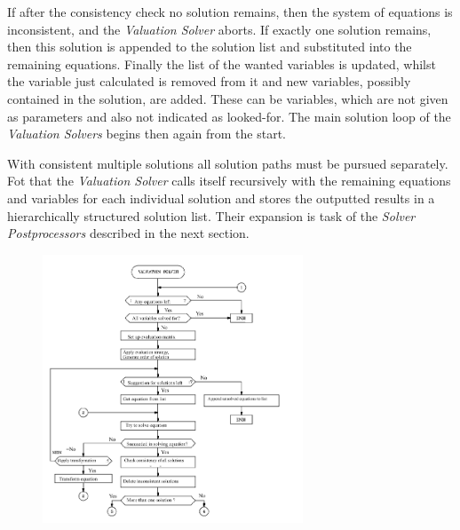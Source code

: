 If after the consistency check no solution  remains, then the system of equations is inconsistent, and the  {\em Valuation Solver} aborts.  If exactly one solution remains, then this solution is appended to the solution list and substituted into the remaining equations. Finally the list of the wanted variables is updated, whilst the variable just calculated is removed from it and new variables, possibly contained in the solution,  are added. These  can be variables, which are not given as parameters and also not indicated as looked-for. The main solution loop of the {\em Valuation Solvers} begins then again from the start.

With consistent multiple solutions all solution paths must be pursued separately. Fot that the {\em Valuation Solver} calls itself recursively with the remaining equations and variables for each individual solution  and stores the outputted results in a hierarchically structured solution list. Their expansion is task of the {\em Solver Postprocessors} described in the next section.


\clearpage

\begin {figure} [htbp]
\begin {center}
\includegraphics[height=8cm]{Valsolv1En.png}
\caption {}
\end {center}
\end {figure}


\clearpage

